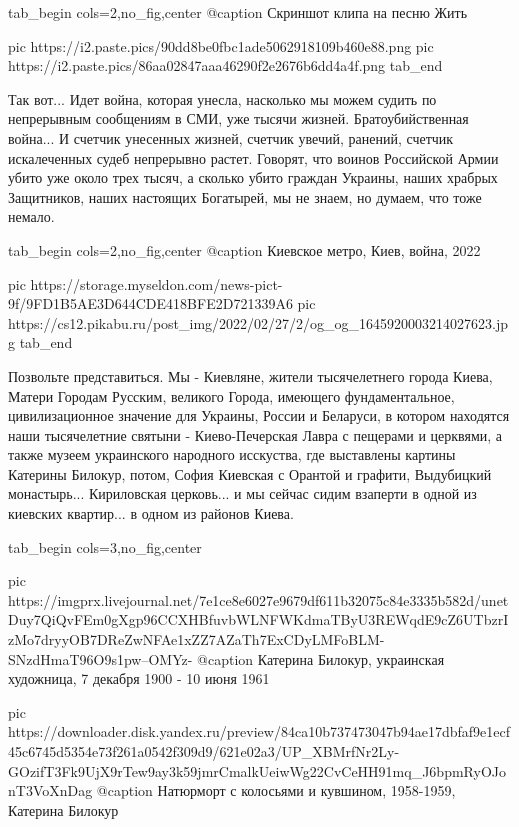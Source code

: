 \ifcmt
  tab_begin cols=2,no_fig,center
	   @caption Скриншот клипа на песню Жить

     pic https://i2.paste.pics/90dd8be0fbc1ade5062918109b460e88.png
		 pic https://i2.paste.pics/86aa02847aaa46290f2e2676b6dd4a4f.png
  tab_end
\fi

Так вот... Идет война, которая унесла, насколько мы можем судить по непрерывным
сообщениям в СМИ, уже тысячи жизней. Братоубийственная война... И счетчик
унесенных жизней, счетчик увечий, ранений, счетчик искалеченных судеб
непрерывно растет. Говорят, что воинов Российской Армии убито уже около трех
тысяч, а сколько убито граждан Украины, наших храбрых Защитников, наших
настоящих Богатырей, мы не знаем, но думаем, что тоже немало. 

\ifcmt
  tab_begin cols=2,no_fig,center
		 @caption Киевское метро, Киев, война, 2022

		 pic https://storage.myseldon.com/news-pict-9f/9FD1B5AE3D644CDE418BFE2D721339A6
     pic https://cs12.pikabu.ru/post_img/2022/02/27/2/og_og_1645920003214027623.jpg
  tab_end
\fi

Позвольте представиться. Мы - Киевляне, жители тысячелетнего города Киева,
Матери Городам Русским, великого Города, имеющего фундаментальное,
цивилизационное значение для Украины, России и Беларуси, в котором находятся
наши тысячелетние святыни - Киево-Печерская Лавра с пещерами и церквями, а
также музеем украинского народного исскуства, где выставлены картины Катерины
Билокур, потом, София Киевская с Орантой и графити, Выдубицкий монастырь...
Кириловская церковь... и мы сейчас сидим взаперти в одной из киевских
квартир... в одном из районов Киева. 

\ifcmt
  tab_begin cols=3,no_fig,center

     pic https://imgprx.livejournal.net/7e1ce8e6027e9679df611b32075c84e3335b582d/unetDuy7QiQvFEm0gXgp96CCXHBfuvbWLNFWKdmaTByU3REWqdE9cZ6UTbzrIzMo7dryyOB7DReZwNFAe1xZZ7AZaTh7ExCDyLMFoBLM-SNzdHmaT96O9s1pw--OMYz-
		 @caption Катерина Билокур, украинская художница, 7 декабря 1900 - 10 июня 1961 

		 pic https://downloader.disk.yandex.ru/preview/84ca10b737473047b94ae17dbfaf9e1ecf45c6745d5354e73f261a0542f309d9/621e02a3/UP_XBMrfNr2Ly-GOzifT3Fk9UjX9rTew9ay3k59jmrCmalkUeiwWg22CvCeHH91mq_J6bpmRyOJonT3VoXnDag%
		 @caption Натюрморт с колосьями и кувшином, 1958-1959, Катерина Билокур

